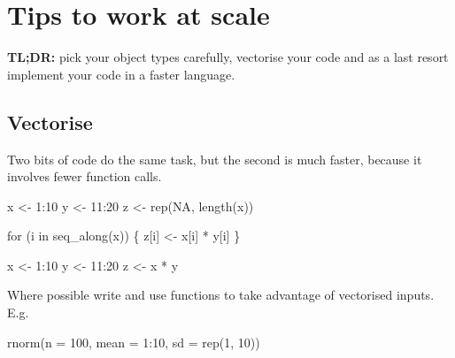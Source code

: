 \documentclass[
  letterpaper,
  DIV=11,
  numbers=noendperiod]{scrreprt}
\newenvironment{Shaded}{\begin{snugshade}}{\end{snugshade}}
\newcommand{\AttributeTok}[1]{\textcolor[rgb]{0.40,0.45,0.13}{#1}}
\newcommand{\ConstantTok}[1]{\textcolor[rgb]{0.56,0.35,0.01}{#1}}
\newcommand{\ControlFlowTok}[1]{\textcolor[rgb]{0.00,0.23,0.31}{#1}}
\newcommand{\DecValTok}[1]{\textcolor[rgb]{0.68,0.00,0.00}{#1}}
\newcommand{\FunctionTok}[1]{\textcolor[rgb]{0.28,0.35,0.67}{#1}}
\newcommand{\NormalTok}[1]{\textcolor[rgb]{0.00,0.23,0.31}{#1}}
\newcommand{\OtherTok}[1]{\textcolor[rgb]{0.00,0.23,0.31}{#1}}
\newcommand{\SpecialCharTok}[1]{\textcolor[rgb]{0.37,0.37,0.37}{#1}}
\begin{document}
\section{Tips to work at scale}\label{tips-to-work-at-scale}

\textbf{TL;DR:} pick your object types carefully, vectorise your code
and as a last resort implement your code in a faster language.

\subsection{Vectorise}\label{vectorise}

Two bits of code do the same task, but the second is much faster,
because it involves fewer function calls.

\begin{Shaded}
\begin{Highlighting}[]
\NormalTok{x }\OtherTok{\textless{}{-}} \DecValTok{1}\SpecialCharTok{:}\DecValTok{10}
\NormalTok{y }\OtherTok{\textless{}{-}} \DecValTok{11}\SpecialCharTok{:}\DecValTok{20} 
\NormalTok{z }\OtherTok{\textless{}{-}} \FunctionTok{rep}\NormalTok{(}\ConstantTok{NA}\NormalTok{, }\FunctionTok{length}\NormalTok{(x))}

\ControlFlowTok{for}\NormalTok{ (i }\ControlFlowTok{in} \FunctionTok{seq\_along}\NormalTok{(x)) \{}
\NormalTok{  z[i] }\OtherTok{\textless{}{-}}\NormalTok{ x[i] }\SpecialCharTok{*}\NormalTok{ y[i]}
\NormalTok{\}}
\end{Highlighting}
\end{Shaded}

\begin{Shaded}
\begin{Highlighting}[]
\NormalTok{x }\OtherTok{\textless{}{-}} \DecValTok{1}\SpecialCharTok{:}\DecValTok{10}
\NormalTok{y }\OtherTok{\textless{}{-}} \DecValTok{11}\SpecialCharTok{:}\DecValTok{20} 
\NormalTok{z }\OtherTok{\textless{}{-}}\NormalTok{ x }\SpecialCharTok{*}\NormalTok{ y}
\end{Highlighting}
\end{Shaded}

Where possible write and use functions to take advantage of vectorised
inputs. E.g.

\begin{Shaded}
\begin{Highlighting}[]
\FunctionTok{rnorm}\NormalTok{(}\AttributeTok{n =} \DecValTok{100}\NormalTok{, }\AttributeTok{mean =} \DecValTok{1}\SpecialCharTok{:}\DecValTok{10}\NormalTok{, }\AttributeTok{sd =} \FunctionTok{rep}\NormalTok{(}\DecValTok{1}\NormalTok{, }\DecValTok{10}\NormalTok{))}
\end{Highlighting}
\end{Shaded}
\end{document}

